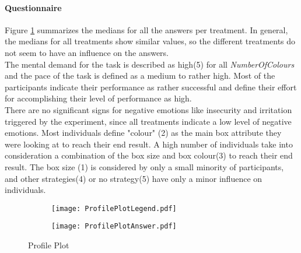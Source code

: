 \paragraph{Questionnaire}
\label{ch:Evaluation:sec:DescriptiveStatistics:subsec:Questionnaire}

Figure \ref{ProfilePlot} summarizes the medians for all the answers per treatment. In general, the medians for all treatments show similar values, so the different treatments do not seem to have an influence on the answers.\\
The mental demand for the task is described as high(5) for all \textit{NumberOfColours} and the pace of the task is defined as a medium to rather high. 
Most of the participants indicate their performance as rather successful and define their effort for accomplishing their level of performance as high.\\  
There are no significant signs for negative emotions like insecurity and irritation triggered by the experiment, since all treatments indicate a low level of negative emotions. 
Most individuals define "colour" (2) as the main box attribute they were looking at to reach their end result. A high number of individuals take into consideration a combination of the box size and box colour(3) to reach their end result.
The box size (1) is considered by only a small minority of participants, and other strategies(4) or no strategy(5) have only a minor influence on individuals. 

 \begin{figure}[htbp] %
\begin{center} %
\begin{subfigure} 
\centering
 \texttt{[image: ProfilePlotLegend.pdf]}
\end{subfigure} 
\begin{subfigure}
\centering
 \texttt{[image: ProfilePlotAnswer.pdf]}
\end{subfigure}   
  \caption{Profile Plot}
  \label{ProfilePlot}
\end{center}
\end{figure}


